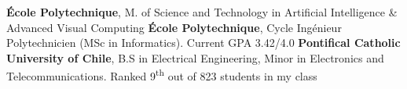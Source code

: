 %
%
%


\begin{scholarship}
    				{\textbf{École Polytechnique}, M. of Science and Technology in Artificial Intelligence \& Advanced Visual Computing
                    }
    \vspace{-1em}
    				{\textbf{École Polytechnique}, Cycle Ingénieur Polytechnicien (MSc in Informatics). Current GPA 3.42/4.0
                    }
    \vspace{-1em}
					{\textbf{Pontifical Catholic University of Chile}, B.S in Electrical Engineering, Minor in Electronics and Telecommunications. Ranked 9\textsuperscript{th} out of 823 students in my class
                    }
\end{scholarship}